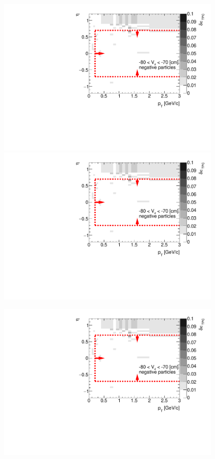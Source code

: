 \begin{figure}[H]
{		\includegraphics[width=\linewidth,page=11]{graphics/systematicsEfficiency/deadMaterial/secondaries_Unbinned_Charged_SDCD.pdf}
		\includegraphics[width=\linewidth,page=14]{graphics/systematicsEfficiency/deadMaterial/secondaries_Unbinned_Charged_SDCD.pdf}\\
	}%
	\parbox{0.325\textwidth}{
		\includegraphics[width=\linewidth,page=3]{graphics/systematicsEfficiency/deadMaterial/secondaries_Unbinned_Charged_SDCD.pdf}\\
}
\end{figure}
